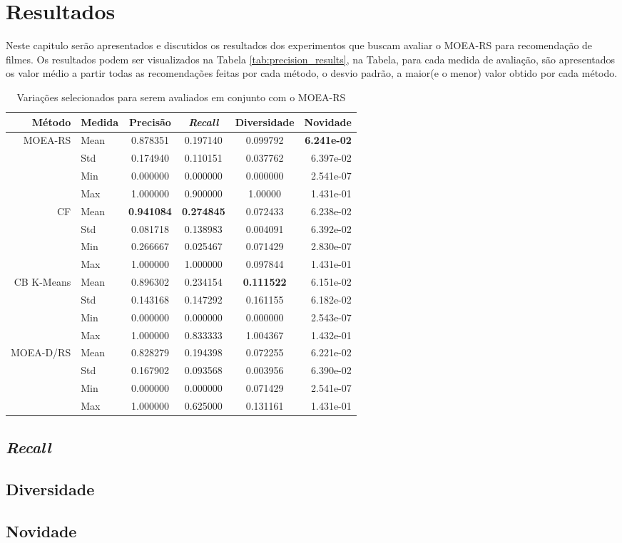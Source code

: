 \chapter{Resultados}

Neste capitulo serão apresentados e discutidos os resultados dos experimentos que buscam avaliar o MOEA-RS para recomendação de filmes. Os resultados  podem ser visualizados na Tabela \ref{tab:precision_results}, na Tabela, para cada medida de avaliação, são apresentados os valor médio a partir todas as recomendações feitas por cada método, o desvio padrão, a maior(e o menor) valor  obtido por cada método.

\begin{table}[h]

\centering
\begin{tabular}{r|l|cccr}Método & Medida & Precisão & \textit{Recall} & Diversidade & Novidade \\ 
\hline                               %
MOEA-RS & Mean & 0.878351 & 0.197140 & 0.099792 & \textbf{6.241e-02} \\
      & Std & 0.174940 & 0.110151 & 0.037762 & 6.397e-02 \\
      & Min & 0.000000 & 0.000000 & 0.000000 & 2.541e-07 \\
      & Max & 1.000000 & 0.900000 & 1.00000 & 1.431e-01 \\
\hline  
CF  & Mean & \textbf{0.941084} & \textbf{0.274845} & 0.072433 & 6.238e-02 \\
    & Std & 0.081718 & 0.138983 & 0.004091 & 6.392e-02 \\
    & Min & 0.266667 & 0.025467 & 0.071429 & 2.830e-07 \\
    & Max & 1.000000 & 1.000000 & 0.097844 & 1.431e-01 \\
\hline  
CB K-Means & Mean & 0.896302 & 0.234154  & \textbf{0.111522} & 6.151e-02\\
    & Std & 0.143168 & 0.147292  & 0.161155 & 6.182e-02 \\
    & Min & 0.000000 & 0.000000 & 0.000000 & 2.543e-07 \\
    & Max & 1.000000 & 0.833333 & 1.004367 & 1.432e-01 \\
\hline  
MOEA-D/RS & Mean & 0.828279  & 0.194398    & 0.072255 & 6.221e-02\\
      & Std & 0.167902  & 0.093568 & 0.003956 & 6.390e-02\\
    & Min & 0.000000 & 0.000000 & 0.071429 & 2.541e-07 \\
    & Max & 1.000000 & 0.625000 & 0.131161 & 1.431e-01
\end{tabular}
\caption{Variações selecionados para serem avaliados em conjunto com o MOEA-RS}
\label{tab:selected_variations_results}
\end{table}

\section{\textit{Recall}}
\section{Diversidade}
\section{Novidade}